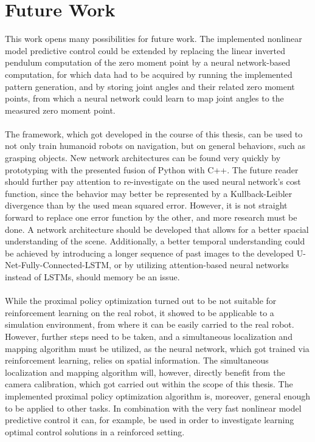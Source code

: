 \section{Future Work}
This work opens many possibilities for future work. The implemented nonlinear model predictive control could be extended by replacing the linear inverted pendulum computation of the zero moment point by a neural network-based computation, for which data had to be acquired by running the implemented pattern generation, and by storing joint angles and their related zero moment points, from which a neural network could learn to map joint angles to the measured zero moment point.\\\\
The framework, which got developed in the course of this thesis, can be used to not only train humanoid robots on navigation, but on general behaviors, such as grasping objects. New network architectures can be found very quickly by prototyping with the presented fusion of Python with C++. The future reader should further pay attention to re-investigate on the used neural network's cost function, since the behavior may better be represented by a Kullback-Leibler divergence than by the used mean squared error. However, it is not straight forward to replace one error function by the other, and more research must be done. A network architecture should be developed that allows for a better spacial understanding of the scene. Additionally, a better temporal understanding could be achieved by introducing a longer sequence of past images to the developed U-Net-Fully-Connected-LSTM, or by utilizing attention-based neural networks instead of LSTMs, should memory be an issue. \\\\
While the proximal policy optimization turned out to be not suitable for reinforcement learning on the real robot, it showed to be applicable to a simulation environment, from where it can be easily carried to the real robot. However, further steps need to be taken, and a simultaneous localization and mapping algorithm must be utilized, as the neural network, which got trained via reinforcement learning, relies on spatial information. The simultaneous localization and mapping algorithm will, however, directly benefit from the camera calibration, which got carried out within the scope of this thesis. The implemented proximal policy optimization algorithm is, moreover, general enough to be applied to other tasks. In combination with the very fast nonlinear model predictive control it can, for example, be used in order to investigate learning optimal control solutions in a reinforced setting.